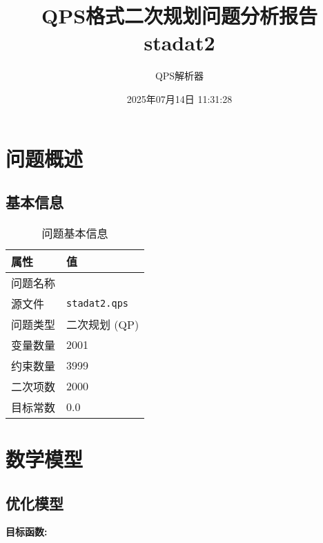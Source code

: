 \documentclass[a4paper,11pt]{article}
\title{QPS格式二次规划问题分析报告\\{\large stadat2}}
\author{QPS解析器}
\date{2025年07月14日 11:31:28}
\begin{document}
\maketitle
\tableofcontents
\newpage

\section{问题概述}
\subsection{基本信息}
\begin{table}[h!]
\centering
\begin{tabular}{ll}
\toprule
\textbf{属性} & \textbf{值} \\
\midrule
问题名称 & \texttt{} \\
源文件 & \texttt{stadat2.qps} \\
问题类型 & 二次规划 (QP) \\
变量数量 & 2001 \\
约束数量 & 3999 \\
二次项数 & 2000 \\
目标常数 & 0.0 \\
\bottomrule
\end{tabular}
\caption{问题基本信息}
\end{table}

\section{数学模型}
\subsection{优化模型}

\textbf{目标函数:}
\end{document}

